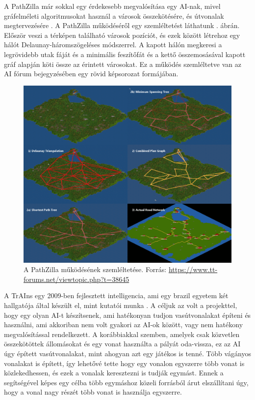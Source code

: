 A PathZilla már sokkal egy érdekesebb megvalósítása egy AI-nak, mivel gráfelméleti algoritmusokat használ a városok összekötésére, és útvonalak megtervezésére \cite{openttdforum}. A PathZilla működéséről egy szemléltetést láthatunk . ábrán. Először veszi a térképen található városok pozíciót, és ezek között létrehoz egy hálót Delaunay-háromszögeléses módszerrel. A kapott hálón megkeresi a legrövidebb utak fáját és a minimális feszítőfát és a kettő összemosásával kapott gráf alapján köti össze az érintett városokat. Ez a működés szemléltetve van az AI fórum bejegyzésében egy rövid képsorozat formájában.

\begin{figure}
	\centering
	\includegraphics[width=\textwidth]{images/pathzilla.png}
	\caption{A PathZilla működésének szemléltetése. Forrás: \url{https://www.tt-forums.net/viewtopic.php?t=38645}}
	\label{fig:pathzilla}
\end{figure}

A TrAIns egy 2009-ben fejlesztett intelligencia, ami egy brazil egyetem két hallgatója által készült el, mint kutatói munka \cite{rios2009trains}. A céljuk az volt a projekttel, hogy egy olyan AI-t készítsenek, ami hatékonyan tudjon vasútvonalakat építeni és használni, ami akkoriban nem volt gyakori az AI-ok között, vagy nem hatékony megvalósítással rendelkezett. A korábbiakkal szemben, amelyek csak közvetlen összekötöttek állomásokat és egy vonat használta a pályát oda-vissza, ez az AI úgy épített vasútvonalakat, mint ahogyan azt egy játékos is tenné. Több vágányos vonalakat is épített, így lehetővé tette hogy egy vonalon egyszerre több vonat is közlekedhessen, és ezek a vonalak keresztezni is tudják egymást. Ennek a segítségével képes egy célba több egymáshoz közeli forrásból árut elszállítani úgy, hogy a vonal nagy részét több vonat is használja egyszerre.

